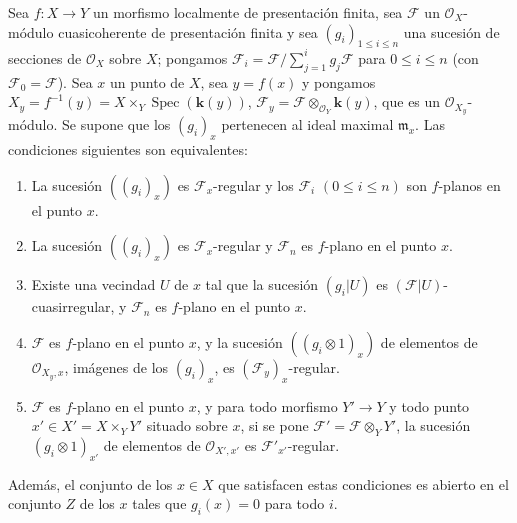 \begin{theorem}[11.3.8]
\label{IV.11.3.8}
Sea $f:X\to Y$ un morfismo localmente de presentación finita, sea $\mathcal F$ un $\mathcal O_X$-módulo cuasicoherente de presentación finita y sea $(g_i)_{1\leq i\leq n}$ una sucesión de secciones de $\mathcal O_X$ sobre $X$; pongamos $\mathcal F_i=\mathcal F\big/\sum_{j=1}^{i}g_j\mathcal F$ para $0\leq i\leq n$ \textup{(}con $\mathcal F_0=\mathcal F$\textup{)}. Sea $x$ un punto de $X$, sea $y=f(x)$ y pongamos $X_y=f^{-1}(y)=X\times_Y\operatorname{Spec}(\boldsymbol{k}(y))$, $\mathcal F_y=\mathcal F\otimes_{\mathcal O_Y}\boldsymbol{k}(y)$, que es un $\mathcal O_{X_y}$-módulo. Se supone que los $(g_i)_x$ pertenecen al ideal maximal $\mathfrak m_x$. Las condiciones siguientes son equivalentes:
\begin{enumerate}[label=\emph{\alph*)}]
  \item La sucesión $((g_i)_x)$ es $\mathcal F_x$-regular y los $\mathcal F_i$ $(0\leq i\leq n)$ son $f$-planos en el punto $x$.
  \item La sucesión $((g_i)_x)$ es $\mathcal F_x$-regular y $\mathcal F_n$ es $f$-plano en el punto $x$.
  \item[\emph{b$'$)}] Existe una vecindad $U$ de $x$ tal que la sucesión $(g_i|U)$ es $(\mathcal F|U)$-cuasirregular, y $\mathcal F_n$ es $f$-plano en el punto $x$.
  \item $\mathcal F$ es $f$-plano en el punto $x$, y la sucesión $((g_i\otimes1)_x)$ de elementos de $\mathcal O_{X_y,x}$, imágenes de los $(g_i)_x$, es $(\mathcal F_y)_x$-regular.
  \item $\mathcal F$ es $f$-plano en el punto $x$, y para todo morfismo $Y'\to Y$ y todo punto $x'\in X'=X\times_YY'$ situado sobre $x$, si se pone $\mathcal F'=\mathcal F\otimes_YY'$, la sucesión $(g_i\otimes1)_{x'}$ de elementos de $\mathcal O_{X',x'}$ es $\mathcal F'_{x'}$-regular.
\end{enumerate}
Además, el conjunto de los $x\in X$ que satisfacen estas condiciones es abierto en el conjunto $Z$ de los $x$ tales que $g_i(x)=0$ para todo $i$.
\end{theorem}

